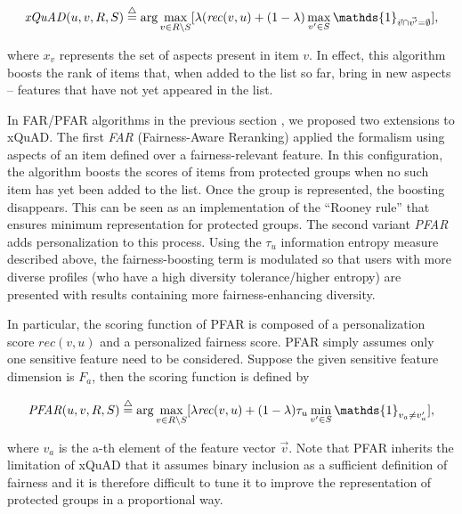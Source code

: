 \begin{equation}
    \mathit{xQuAD}(u,v,R,S)\buildrel\triangle\over= \arg\max_{v \in R \setminus S} [\lambda  (\mathit{rec}(v,u) + (1 - \lambda) \max_{v' \in S} \mathds{1}_{\vec{v} \cap \Vec{v'} = \emptyset}],
\label{eq:xquad}
\end{equation}

\noindent where $x_v$ represents the set of aspects present in item $v$. In effect, this algorithm boosts the rank of items that, when added to the list so far, bring in new aspects -- features that have not yet appeared in the list. 

In FAR/PFAR algorithms in the previous section \cite{liu2018personalizing,liu2019personalized}, we proposed two extensions to xQuAD. The first \textit{FAR} (Fairness-Aware Reranking) applied the formalism using aspects of an item defined over a fairness-relevant feature. In this configuration, the algorithm boosts the scores of items from protected groups when no such item has yet been added to the list. Once the group is represented, the boosting disappears. This can be seen as an implementation of the ``Rooney rule'' \cite{kleinberg2018selection} that ensures minimum representation for protected groups. The second variant \textit{PFAR} adds personalization to this process. Using the $\tau_u$ information entropy measure described above, the fairness-boosting term is modulated so that users with more diverse profiles (who have a high diversity tolerance/higher entropy) are presented with results containing more fairness-enhancing diversity.

In particular, the scoring function of PFAR is composed of a personalization score $\mathit{rec}(v,u)$ and a personalized fairness score. PFAR simply assumes only one sensitive feature need to be considered. Suppose the given sensitive feature dimension is $F_a$, then the scoring function is defined by

\begin{equation}
    \mathit{PFAR}(u,v,R,S)\buildrel\triangle\over= \arg\max_{v \in R \setminus S}[\lambda\mathit{rec}(v,u) + (1-\lambda)\tau_u \min_{v' \in S} \mathds{1}_{v_{a} \neq v'_{a}}],
\end{equation}

where $v_{a}$ is the a-th element of the feature vector $\vec{v}$.
Note that PFAR inherits the limitation of xQuAD that it assumes binary inclusion as a sufficient definition of fairness and it is therefore difficult to tune it to improve the representation of protected groups in a proportional way. 



